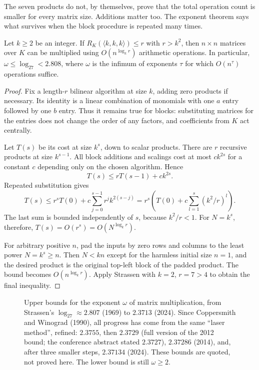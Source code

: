 The seven products do not, by themselves, prove that the total operation count is smaller for every matrix size. Additions matter too. The exponent theorem says what survives when the block procedure is repeated many times.

\begin{theorem}\label{linear:thm:omega}
Let $k\ge2$ be an integer. If $R_K(\langle k,k,k\rangle)\le r$ with $r>k^2$, then $n\times n$ matrices over $K$ can be multiplied using $O(n^{\log_kr})$ arithmetic operations. In particular,
$\omega\le\log_27<2.808$, where $\omega$ is the infimum of exponents $\tau$ for which $O(n^\tau)$ operations suffice.
\end{theorem}
\begin{proof}
Fix a length-$r$ bilinear algorithm at size $k$, adding zero products if necessary. Its identity is a linear combination of monomials with one $a$ entry followed by one $b$ entry. Thus it remains true for blocks: substituting matrices for the entries does not change the order of any factors, and coefficients from $K$ act centrally.

Let $T(s)$ be its cost at size $k^s$, down to scalar products. There are $r$ recursive products at size $k^{s-1}$. All block additions and scalings cost at most $c k^{2s}$ for a constant $c$ depending only on the chosen algorithm. Hence
\[
T(s)\le rT(s-1)+ck^{2s}.
\]
Repeated substitution gives
\[
T(s)\le r^sT(0)+c\sum_{j=0}^{s-1}r^jk^{2(s-j)}
 =r^s\left(T(0)+c\sum_{l=1}^{s}(k^2/r)^l\right).
\]
The last sum is bounded independently of $s$, because $k^2/r<1$. For $N=k^s$, therefore, $T(s)=O(r^s)=O(N^{\log_kr})$.

For arbitrary positive $n$, pad the inputs by zero rows and columns to the least power $N=k^s\ge n$. Then $N<kn$ except for the harmless initial size $n=1$, and the desired product is the original top-left block of the padded product. The bound becomes $O(n^{\log_kr})$. Apply Strassen with $k=2$, $r=7>4$ to obtain the final inequality.
\end{proof}

\begin{figure}[ht]
\centering
{}
\caption{Upper bounds for the exponent $\omega$ of matrix multiplication, from Strassen's $\log_27\approx2.807$ (1969) to $2.3713$
(2024). Since Coppersmith and Winograd (1990), all progress has come from the same ``laser method'', refined: $2.3755$, then
$2.3729$ (full version of the 2012 bound; the conference abstract stated $2.3727$), $2.37286$ (2014), and, after three smaller steps, $2.37134$ (2024). These bounds are quoted, not proved here. The lower bound is still $\omega\ge2$.}
\label{linear:fig:omega}
\end{figure}

